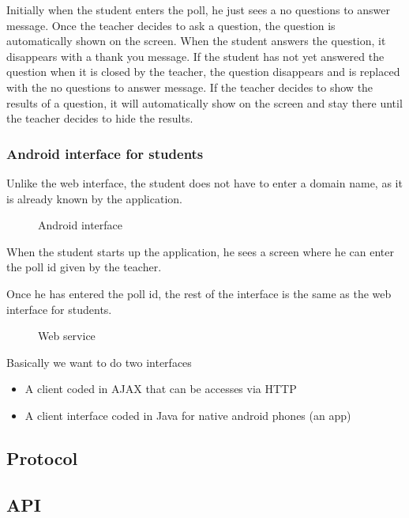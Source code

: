 \documentclass{acm_proc_article-sp}
\begin{document}
Initially when the student enters the poll, he just sees a no questions to answer message. Once the teacher decides to ask a question, the question is automatically shown on the screen. When the student answers the question, it disappears with a thank you message. If the student has not yet answered the question when it is closed by the teacher, the question disappears and is replaced with the no questions to answer message. If the teacher decides to show the results of a question, it will automatically show on the screen and stay there until the teacher decides to hide the results.
\subsubsection{Android interface for students}
Unlike the web interface, the student does not have to enter a domain name, as it is already known by the application.

\begin{figure}[h]
\centering
{}
\caption{Android interface}
\label{fig:android_interface}
\end{figure}

When the student starts up the application, he sees a screen where he can enter the poll id given by the teacher.

Once he has entered the poll id, the rest of the interface is the same as the web interface for students.

\begin{figure}[h]
\centering
{}
\caption{Web service}
\label{fig:web_service}
\end{figure}
Basically we want to do two interfaces

\begin{itemize}
  \item A client coded in AJAX that can be accesses via HTTP
  \item A client interface coded in Java for native android phones (an app)
\end{itemize}

\subsection{Protocol}

\subsection{API}
\end{document}
